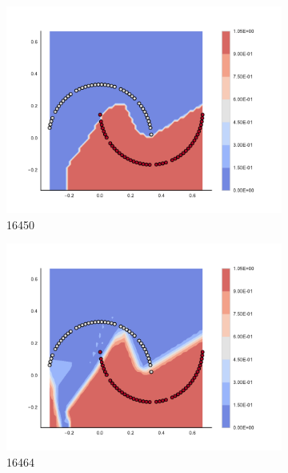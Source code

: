 \begin{figure}[h]
\begin{subfigure}[b]{0.09\textwidth}
    \includegraphics[clip, trim=2.35cm 1.75cm 4.5cm 0cm,width=\textwidth]{img/convergence/16450.pdf}
    \caption{16450}
    \label{fig:convergence_16450}
\end{subfigure}
%
\begin{subfigure}[b]{0.09\textwidth}
    \includegraphics[clip, trim=2.35cm 1.75cm 4.5cm 0cm,width=\textwidth]{img/convergence/16464.pdf}
    \caption{16464}
    \label{fig:convergence_16464}
\end{subfigure}
%
\begin{subfigure}[b]{0.09\textwidth}

\end{subfigure}
\end{figure}
